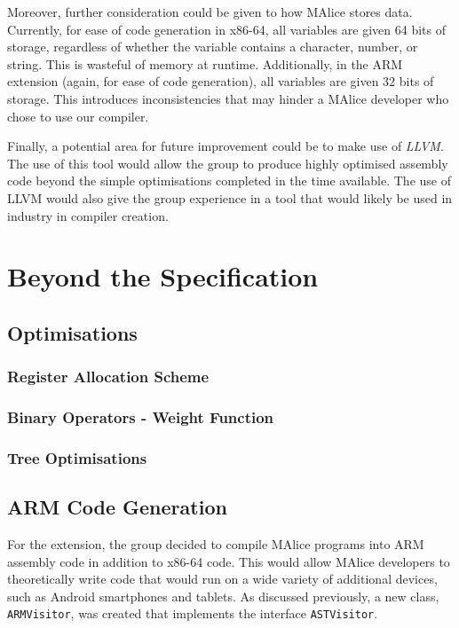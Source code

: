 \documentclass[a4wide, 11pt]{article}
\begin{document}
Moreover, further consideration could be given to how MAlice stores data. 
Currently, for ease of code generation in x86-64, all variables are given
64 bits of storage, regardless of whether the variable contains a character,
number, or string. This is wasteful of memory at runtime. Additionally, in the
ARM extension (again, for ease of code generation), all variables are given
32 bits of storage. This introduces inconsistencies that may hinder a MAlice
developer who chose to use our compiler.

Finally, a potential area for future improvement could be to make use of
\emph{LLVM}. The use of this tool would allow the group to produce highly
optimised assembly code beyond the simple optimisations completed in the time
available. The use of LLVM would also give the group experience in a tool that
would likely be used in industry in compiler creation.

\section{Beyond the Specification}

\subsection{Optimisations}

\subsubsection{Register Allocation Scheme}

\subsubsection{Binary Operators - Weight Function}

\subsubsection{Tree Optimisations}

\subsection{ARM Code Generation}

For the extension, the group decided to compile MAlice programs into ARM
assembly code in addition to x86-64 code. This would allow MAlice developers
to theoretically write code that would run on a wide variety of additional
devices, such as Android smartphones and tablets. As discussed previously, 
a new class, \texttt{ARMVisitor}, was created that implements the interface
\texttt{ASTVisitor}.
\end{document}
